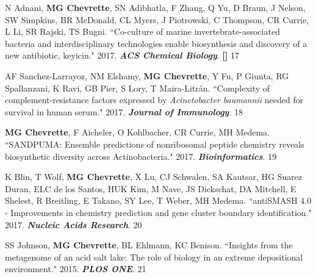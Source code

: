 \begin{cvpubs}
\end{cvpubs} \begin{cvpubs}

\cvpub
{N Adnani, \textbf{MG Chevrette}, SN Adibhatla, F Zhang, Q Yu, D Braun, J Nelson, SW Simpkins, BR McDonald, CL Myers, J Piotrowski, C Thompson, CR Currie, L Li, SR Rajski, TS Bugni. ``Co-culture of marine invertebrate-associated bacteria and interdisciplinary technologies enable biosynthesis and discovery of a new antibiotic, keyicin." 2017. \textit{\textbf{ACS Chemical Biology}}.  \textbf{\textit{}} \textbf{[\textit{}]}}
{17}

\cvpub
{AF Sanchez-Larrayoz, NM Elshamy, \textbf{MG Chevrette}, Y Fu, P Giunta, RG Spallanzani, K Ravi, GB Pier, S Lory, T Maira-Litr\'{a}n. ``Complexity of complement-resistance factors expressed by \textit{Acinetobacter baumannii} needed for survival in human serum." 2017. \textit{\textbf{Journal of Immunology}}. \textbf{\textit{}}}
{18}

\cvpub
{\textbf{MG Chevrette}, F Aicheler, O Kohlbacher, CR Currie, MH Medema. ``SANDPUMA: Ensemble predictions of nonribosomal peptide chemistry reveals biosynthetic diversity across Actinobacteria." 2017. \textit{\textbf{Bioinformatics}}. \textbf{\textit{}}}
{19}

\cvpub
{K Blin, T Wolf, \textbf{MG Chevrette}, X Lu, CJ Schwalen, SA Kautsar, HG Suarez Duran, ELC de los Santos, HUK Kim, M Nave, JS Dickschat, DA Mitchell, E Shelest, R Breitling, E Takano, SY Lee, T Weber, MH Medema. ``antiSMASH 4.0 - Improvements in chemistry prediction and gene cluster boundary identification." 2017. \textit{\textbf{Nucleic Acids Research}}. \textbf{\textit{}}}
{20}

\cvpub
{SS Johnson, \textbf{MG Chevrette}, BL Ehlmann, KC Benison. ``Insights from the metagenome of an acid salt lake: The role of biology in an extreme depositional environment."  2015. \textit{\textbf{PLOS ONE}}. \textbf{\textit{}}}
{21}

\end{cvpubs}

